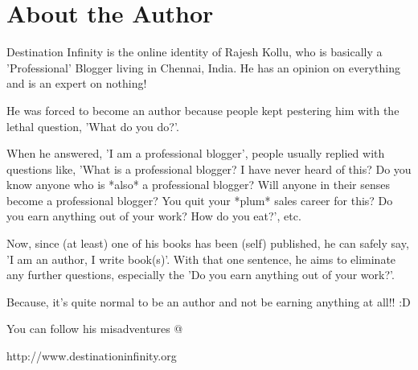 \chapter{About the Author}

Destination Infinity is the online identity of Rajesh Kollu, who is basically a
'Professional' Blogger living in Chennai, India. He has an opinion on everything
and is an expert on nothing!

He was forced to become an author because people kept pestering him with the
lethal question, 'What do you do?'.

When he answered, 'I am a professional blogger', people usually replied with
questions like, 'What is a professional blogger? I have never heard of this? Do
you know anyone who is *also* a professional blogger? Will anyone in their
senses become a professional blogger? You quit your *plum* sales career for
this? Do you earn anything out of your work? How do you eat?', etc.

Now, since (at least) one of his books has been (self) published, he can safely
say, 'I am an author, I write book(s)'. With that one sentence, he aims to
eliminate any further questions, especially the 'Do you earn anything out of
your work?'.

Because, it's quite normal to be an author and not be earning anything at all!!
:D

You can follow his misadventures @

http://www.destinationinfinity.org